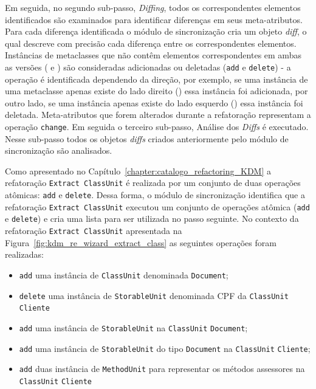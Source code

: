 Em seguida, no segundo sub-passo, \textit{Diffing}, todos os correspondentes elementos identificados são examinados para identificar diferenças em seus meta-atributos. Para cada diferença identificada o módulo de sincronização cria um objeto \textit{diff}, o qual descreve com precisão cada diferença entre os correspondentes elementos. Instâncias de metaclasses que não contêm elementos correspondentes em ambas as versões ( e ) são consideradas adicionadas ou deletadas (\texttt{add} e \texttt{delete}) - a operação é identificada dependendo da direção, por exemplo, se uma instância de uma metaclasse apenas existe do lado direito () essa instância foi adicionada, por outro lado, se uma instância apenas existe do lado esquerdo () essa instância foi deletada. Meta-atributos que forem alterados durante a refatoração representam a operação \texttt{change}. Em seguida o terceiro sub-passo, Análise dos \textit{Diffs} é executado. Nesse sub-passo todos os objetos \textit{diffs} criados anteriormente pelo módulo de sincronização são analisados.


Como apresentado no Capítulo~\ref{chapter:catalogo_refactoring_KDM} a refatoração \texttt{Extract ClassUnit} é realizada por um conjunto de duas operações atômicas: \texttt{add} e  \texttt{delete}. Dessa forma, o módulo de sincronização identifica que a refatoração \texttt{Extract ClassUnit} executou um conjunto de operações atômica (\texttt{add} e  \texttt{delete}) e cria uma lista para ser utilizada no passo seguinte. No contexto da refatoração \texttt{Extract ClassUnit} apresentada na Figura~\ref{fig:kdm_re_wizard_extract_class} as seguintes operações foram realizadas: 

\begin{itemize}
\item \texttt{add} uma instância de \texttt{ClassUnit} denominada \texttt{Document};
\item \texttt{delete} uma instância de \texttt{StorableUnit} denominada CPF da \texttt{ClassUnit} \texttt{Cliente}
\item \texttt{add} uma instância de \texttt{StorableUnit} na \texttt{ClassUnit} \texttt{Document};
\item \texttt{add} uma instância de \texttt{StorableUnit} do tipo \texttt{Document} na \texttt{ClassUnit} \texttt{Cliente};
\item \texttt{add} duas instância de \texttt{MethodUnit} para representar os métodos assessores na \texttt{ClassUnit} \texttt{Cliente}
\end{itemize}

